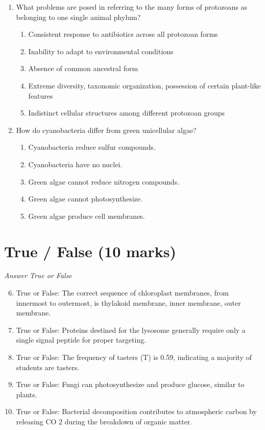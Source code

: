 \documentclass[12pt]{article}
\begin{document}
\begin{enumerate}[label=\arabic*.]
\begin{enumerate}[label=(\alph*)]
\end{enumerate}
\item What problems are posed in referring to the many forms of protozoans as belonging to one single animal phylum?
\begin{enumerate}[label=(\alph*)]
    \item Consistent response to antibiotics across all protozoan forms
    \item Inability to adapt to environmental conditions
    \item Absence of common ancestral form
    \item Extreme diversity, taxonomic organization, possession of certain plant-like features
    \item Indistinct cellular structures among different protozoan groups
\end{enumerate}
\item How do cyanobacteria differ from green unicellular algae?
\begin{enumerate}[label=(\alph*)]
    \item Cyanobacteria reduce sulfur compounds.
    \item Cyanobacteria have no nuclei.
    \item Green algae cannot reduce nitrogen compounds.
    \item Green algae cannot photosynthesize.
    \item Green algae produce cell membranes.
\end{enumerate}
\end{enumerate}

\section*{True / False (10 marks)}
\textit{Answer True or False}
\begin{enumerate}[label=\arabic*.]
\setcounter{enumi}{5}
\item True or False: The correct sequence of chloroplast membranes, from innermost to outermost, is thylakoid membrane, inner membrane, outer membrane.
\item True or False: Proteins destined for the lysosome generally require only a single signal peptide for proper targeting.
\item True or False: The frequency of tasters (T) is 0.59, indicating a majority of students are tasters.
\item True or False: Fungi can photosynthesize and produce glucose, similar to plants.
\item True or False: Bacterial decomposition contributes to atmospheric carbon by releasing CO 2 during the breakdown of organic matter.
\end{enumerate}
\end{document}
